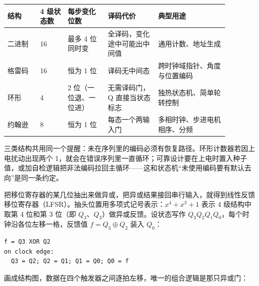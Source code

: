 \begin{longtable}{L{0.13\linewidth}L{0.11\linewidth}L{0.16\linewidth}L{0.20\linewidth}L{0.28\linewidth}}
\toprule
结构 & 4 级状态数 & 每步变化位数 & 译码代价 & 典型用途 \\
\midrule
二进制 & 16 & 最多 4 位同时变 & 全译码，变化途中可能出中间值 & 通用计数、地址生成 \\
格雷码 & 16 & 恒为 1 位 & 译码无中间态 & 跨时钟域指针、角度与位置编码 \\
环形 & 4 & 2 位（一位退、一位进） & 无需译码门，Q 直接当状态标志 & 独热状态机、简单轮转控制 \\
约翰逊 & 8 & 恒为 1 位 & 每态一个两输入门 & 多相时钟、步进电机相序、分频 \\
\bottomrule
\end{longtable}

三类结构共用同一个提醒：未在序列里的编码必须有恢复路径。环形计数器若因上电扰动出现两个 1，就会在错误序列里一直循环；可靠设计要在上电时置入种子值，或加自检逻辑把非法编码拉回主循环——这和状态机“未使用编码要有默认去向”是同一条约定。


把移位寄存器的某几位抽出来做异或，把异或结果接回串行输入，就得到线性反馈移位寄存器（LFSR）。抽头位置用多项式记号表示：$x^4+x^3+1$ 表示 4 级结构中取第 4 位和第 3 位（即 $Q_3$、$Q_2$）做异或反馈。设状态写作 $Q_3Q_2Q_1Q_0$，每个时钟沿各位左移一格，反馈值 $f=Q_3\oplus Q_2$ 装入 $Q_0$：

\begin{lstlisting}
f = Q3 XOR Q2
on clock edge:
  Q3 = Q2; Q2 = Q1; Q1 = Q0; Q0 = f
\end{lstlisting}

画成结构图，数据在四个触发器之间逐拍左移，唯一的组合逻辑是那只异或门：

